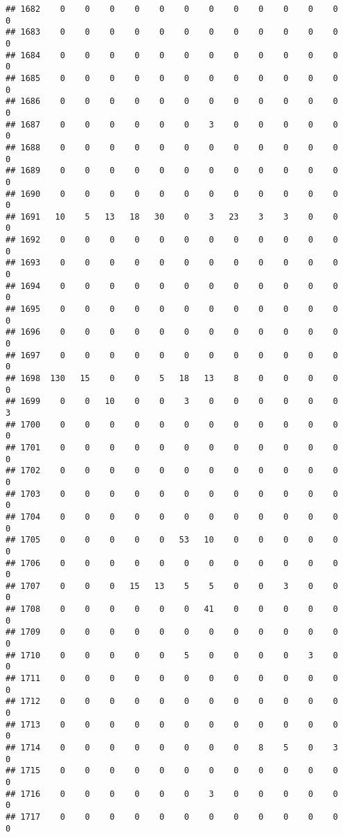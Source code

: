\documentclass[]{article}
\begin{document}
\begin{verbatim}
## 1682    0    0    0    0    0    0    0    0    0    0    0    0    0
## 1683    0    0    0    0    0    0    0    0    0    0    0    0    0
## 1684    0    0    0    0    0    0    0    0    0    0    0    0    0
## 1685    0    0    0    0    0    0    0    0    0    0    0    0    0
## 1686    0    0    0    0    0    0    0    0    0    0    0    0    0
## 1687    0    0    0    0    0    0    3    0    0    0    0    0    0
## 1688    0    0    0    0    0    0    0    0    0    0    0    0    0
## 1689    0    0    0    0    0    0    0    0    0    0    0    0    0
## 1690    0    0    0    0    0    0    0    0    0    0    0    0    0
## 1691   10    5   13   18   30    0    3   23    3    3    0    0    0
## 1692    0    0    0    0    0    0    0    0    0    0    0    0    0
## 1693    0    0    0    0    0    0    0    0    0    0    0    0    0
## 1694    0    0    0    0    0    0    0    0    0    0    0    0    0
## 1695    0    0    0    0    0    0    0    0    0    0    0    0    0
## 1696    0    0    0    0    0    0    0    0    0    0    0    0    0
## 1697    0    0    0    0    0    0    0    0    0    0    0    0    0
## 1698  130   15    0    0    5   18   13    8    0    0    0    0    0
## 1699    0    0   10    0    0    3    0    0    0    0    0    0    3
## 1700    0    0    0    0    0    0    0    0    0    0    0    0    0
## 1701    0    0    0    0    0    0    0    0    0    0    0    0    0
## 1702    0    0    0    0    0    0    0    0    0    0    0    0    0
## 1703    0    0    0    0    0    0    0    0    0    0    0    0    0
## 1704    0    0    0    0    0    0    0    0    0    0    0    0    0
## 1705    0    0    0    0    0   53   10    0    0    0    0    0    0
## 1706    0    0    0    0    0    0    0    0    0    0    0    0    0
## 1707    0    0    0   15   13    5    5    0    0    3    0    0    0
## 1708    0    0    0    0    0    0   41    0    0    0    0    0    0
## 1709    0    0    0    0    0    0    0    0    0    0    0    0    0
## 1710    0    0    0    0    0    5    0    0    0    0    3    0    0
## 1711    0    0    0    0    0    0    0    0    0    0    0    0    0
## 1712    0    0    0    0    0    0    0    0    0    0    0    0    0
## 1713    0    0    0    0    0    0    0    0    0    0    0    0    0
## 1714    0    0    0    0    0    0    0    0    8    5    0    3    0
## 1715    0    0    0    0    0    0    0    0    0    0    0    0    0
## 1716    0    0    0    0    0    0    3    0    0    0    0    0    0
## 1717    0    0    0    0    0    0    0    0    0    0    0    0    0

\end{verbatim}
\end{document}

